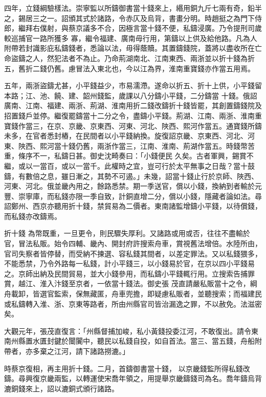 \begin{pinyinscope}
 四年，立錢綱驗樣法。崇寧監以所鑄御書當十錢來上，緡用銅九斤七兩有奇，鉛半之，錫居三之一。詔頒其式於諸路，令赤仄及烏背，書畫分明。時趙挺之為門下侍郎，繼拜右僕射，與蔡京議多不合，因極言當十錢不便，私鑄浸廣。乃令提刑司歲較巡捕官一路所獲多
 寡，繼令福建、廣南毋行用，第鑄以上供及給他路。凡為人附帶若封識影庇私鑄錢者，悉論以法，毋得蔭贖。其置鑄錢院，蓋將以盡收所在亡命盜鑄之人，然犯法者不為止。乃命荊湖南北、江南東西、兩浙並以折十錢為折五，舊折二錢仍舊。慮冒法入東北也，今以江為界，淮南重寶錢亦作當五用焉。



 五年，兩浙盜鑄尤甚，小平錢益少，市易濡滯。遂命以折五、折十上供，小平錢留本路；江、池、饒、建、韶州錢監，歲課以八分鑄小平錢，二分鑄當
 十錢。俄詔廣南、江南、福建、兩浙、荊湖、淮南用折二錢改鑄折十錢皆罷，其創置鑄錢院及招置錢戶並停。繼復罷鑄當十二分之令，盡鑄小平錢。荊湖、江南、兩浙、淮南重寶錢作當三，在京、京畿、京東西、河東、河北、陜西、熙河作當五。通寶錢所鑄未多，在官者悉封樁，在民間者以小平錢納換。旋復詔京畿、京東西、河北、河東、陜西、熙河當十錢仍舊，兩浙作當三，江南、淮南、荊湖作當五。時錢幣苦重，條序不一，私鑄日甚。御史沈畸奏曰：「小錢便民
 久矣。古者軍興，錫賞不繼，或以一當百，或以一當千。此權時之宜，豈可行於太平無事之日哉？當十鼓鑄，有數倍之息，雖日漸之，其勢不可遏。」未幾，詔當十錢止行於京師、陜西、河東、河北。俄並畿內用之，餘路悉禁。期一季送官，償以小錢，換納到者輸於元豐、崇寧庫，而私錢亦限一季自致，計銅直增二分，償以小錢，隱藏者論如法。尋詔鄭州、西京亦聽用折十錢，禁貿易為二價者。東南諸監增鑄小平錢，以待償錢，而私錢亦改鑄焉。



 折十錢
 為幣既重，一旦更令，則民驟失厚利。又諸路或用或否，往往不盡輸於官，冒法私販。始令四輔、畿內、開封府許搜索舟車，賞視舊法增倍。水陸所由，官司失察者皆停替，而受納不揀選、容私錢其間者，以差定罪法。又以私錢猥多，不能悉禁，乃令外路每一私錢，計小平錢三，以小錢易於官，在京以四小平錢易之。京師出納及民間貿易，並大小錢參用，而私鑄小平錢輒行用。立搜索告捕罪賞，越江、淮入汴錢至京者，一依當十錢法。御史張
 茂直請嚴私販當十之令，綱舟載卸，皆選官監索，保無藏匿，舟車兜擔，即疑慮私販者，並聽搜索；而福建民或私鑄轉入淮、浙、京東等路者，所由州縣官司皆治漏逸之罪，不以赦免。法滋密矣。



 大觀元年，張茂直復言：「州縣督捕加峻，私小黃錢投委江河，不敢復出。請令東南州縣置水匱封鍵於闤闠中，聽民以私錢自投，如自首法。當三、當五錢，舟船附帶者，亦多棄之江河，請下諸路撈漉。」



 時蔡京復相，再主用折十錢。二月，首鑄御書當十錢，
 以京畿錢監所得私錢改鑄。尋興復京畿兩監，以轉運使宋喬年領之，用提舉京畿鑄錢司為名。喬年鑄烏背漉銅錢來上，詔以漉銅式頒行諸路。




\end{pinyinscope}
